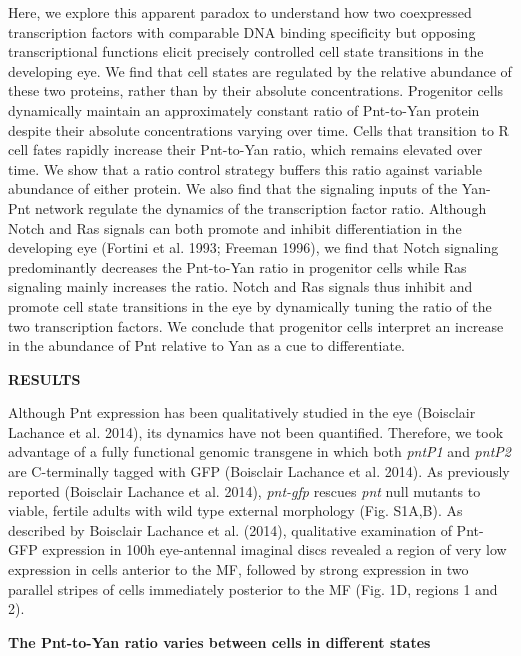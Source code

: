 Here, we explore this apparent paradox to understand how two coexpressed transcription factors with comparable DNA binding specificity but opposing transcriptional functions elicit precisely controlled cell state transitions in the developing eye. We find that cell states are regulated by the relative abundance of these two proteins, rather than by their absolute concentrations. Progenitor cells dynamically maintain an approximately constant ratio of Pnt-to-Yan protein despite their absolute concentrations varying over time. Cells that transition to R cell fates rapidly increase their Pnt-to-Yan ratio, which remains elevated over time. We show that a ratio control strategy buffers this ratio against variable abundance of either protein. We also find that the signaling inputs of the Yan-Pnt network regulate the dynamics of the transcription factor ratio. Although Notch and Ras signals can both promote and inhibit differentiation in the developing eye (Fortini et al. 1993; Freeman 1996), we find that Notch signaling predominantly decreases the Pnt-to-Yan ratio in progenitor cells while Ras signaling mainly increases the ratio. Notch and Ras signals thus inhibit and promote cell state transitions in the eye by dynamically tuning the ratio of the two transcription factors. We conclude that progenitor cells interpret an increase in the abundance of Pnt relative to Yan as a cue to differentiate.

\textbf{RESULTS}

Although Pnt expression has been qualitatively studied in the eye (Boisclair Lachance et al. 2014), its dynamics have not been quantified. Therefore, we took advantage of a fully functional genomic transgene in which both \emph{pntP1} and \emph{pntP2} are C-terminally tagged with GFP (Boisclair Lachance et al. 2014). As previously reported (Boisclair Lachance et al. 2014), \emph{pnt-gfp} rescues \emph{pnt} null mutants to viable, fertile adults with wild type external morphology (Fig. S1A,B). As described by Boisclair Lachance et al. (2014), qualitative examination of Pnt-GFP expression in 100h eye-antennal imaginal discs revealed a region of very low expression in cells anterior to the MF, followed by strong expression in two parallel stripes of cells immediately posterior to the MF (Fig. 1D, regions 1 and 2).

\textbf{The Pnt-to-Yan ratio varies between cells in different states }

